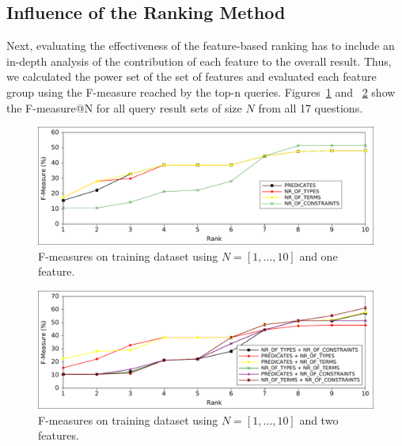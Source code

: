 \subsection{Influence of the Ranking Method}
Next, evaluating the effectiveness of the feature-based ranking has to include an in-depth analysis of the contribution of each feature to the overall result.
Thus, we calculated the power set of the set of features and evaluated each feature group using the F-measure reached by the top-n queries. 
Figures~\ref{chahawk:fig:ranking_1} and ~\ref{chahawk:fig:ranking_2} show the F-measure@N for all query result sets of size $N$ from all 17 questions. 
\begin{figure}[htb!]
\includegraphics[width=\linewidth]{part_03/ESWC_HAWK/onefeature}
\caption{F-measures on training dataset using $N=[1,\ldots,10]$ and one feature.}
\label{chahawk:fig:ranking_1}
\end{figure}
\begin{figure}[htb!]
\includegraphics[width=\linewidth]{part_03/ESWC_HAWK/twofeature}
\caption{F-measures on training dataset using $N=[1,\ldots,10]$ and two features.}
\label{chahawk:fig:ranking_2}
\end{figure}

